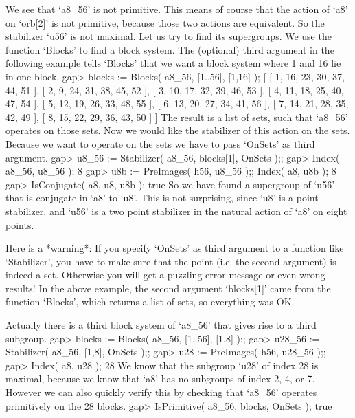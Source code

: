 We see that `a8_56'   is not primitive. This  means  of course   that the
action  of `a8'  on  `orb[2]'  is not  primitive,  because those   two
actions are equivalent. So the stabilizer `u56' is not maximal. Let us
try to find its supergroups. We use the function `Blocks' to find a block
system. The  (optional) third  argument  in the following   example tells
`Blocks' that we want a block system where 1 and 16 lie in one block.
\beginexample
gap> blocks := Blocks( a8_56, [1..56], [1,16] );
[ [ 1, 16, 23, 30, 37, 44, 51 ], [ 2, 9, 24, 31, 38, 45, 52 ], 
  [ 3, 10, 17, 32, 39, 46, 53 ], [ 4, 11, 18, 25, 40, 47, 54 ],
  [ 5, 12, 19, 26, 33, 48, 55 ], [ 6, 13, 20, 27, 34, 41, 56 ],
  [ 7, 14, 21, 28, 35, 42, 49 ], [ 8, 15, 22, 29, 36, 43, 50 ] ] 
\endexample
The result is a list  of sets, such that  `a8_56' operates on those sets.
Now we would like  the stabilizer of this  action on the sets. Because
we  want to operate on   the sets we  have  to  pass `OnSets' as  third
argument.
\beginexample
gap> u8_56 := Stabilizer( a8_56, blocks[1], OnSets );;
gap> Index( a8_56, u8_56 );
8
gap> u8b := PreImages( h56, u8_56 );; Index( a8, u8b );
8
gap> IsConjugate( a8, u8, u8b );
true
\endexample
So we have found a supergroup of `u56' that is conjugate in `a8' to `u8'.
This is not surprising, since `u8' is a point stabilizer, and `u56' is a
two point stabilizer in the natural action of `a8' on eight points.

Here  is a *warning*:   If you specify `OnSets'  as  third argument  to a
function like  `Stabilizer', you have to  make sure that the  point (i.e.
the second argument) is  indeed a set. Otherwise you  will get a puzzling
error message or  even  wrong results! In  the above  example, the second
argument  `blocks[1]'  came from the  function  `Blocks', which returns a
list of sets, so everything was OK.

Actually there  is a third  block system of `a8_56'  that gives rise to a
third subgroup.
\beginexample
gap> blocks := Blocks( a8_56, [1..56], [1,8] );;
gap> u28_56 := Stabilizer( a8_56, [1,8], OnSets );;
gap> u28 := PreImages( h56, u28_56 );;
gap> Index( a8, u28 );
28 
\endexample
We know that  the subgroup `u28' of index  28 is maximal, because we know
that  `a8' has no  subgroups  of index 2,  4,  or 7.  However we can also
quickly verify this by checking  that `a8_56' operates primitively on the
28 blocks.
\beginexample
gap> IsPrimitive( a8_56, blocks, OnSets );
true 
\endexample

